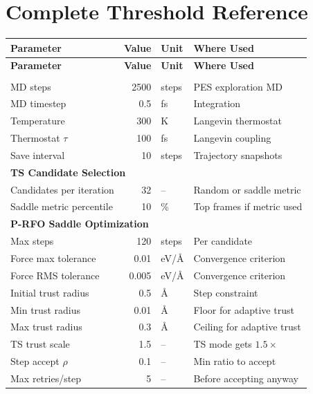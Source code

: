 \documentclass[11pt,a4paper]{article}
\begin{document}
\section{Complete Threshold Reference}
\label{sec:thresholds}

\begin{longtable}{p{5cm}rlp{6cm}}
\toprule
\textbf{Parameter} & \textbf{Value} & \textbf{Unit} & \textbf{Where Used} \\
\midrule
\endfirsthead
\toprule
\textbf{Parameter} & \textbf{Value} & \textbf{Unit} & \textbf{Where Used} \\
\midrule
\endhead
\bottomrule
\endfoot
\multicolumn{4}{l}{\textbf{Molecular Dynamics}} \\
\midrule
MD steps & 2500 & steps & PES exploration MD \\
MD timestep & 0.5 & fs & Integration \\
Temperature & 300 & K & Langevin thermostat \\
Thermostat $\tau$ & 100 & fs & Langevin coupling \\
Save interval & 10 & steps & Trajectory snapshots \\
\midrule
\multicolumn{4}{l}{\textbf{TS Candidate Selection}} \\
\midrule
Candidates per iteration & 32 & -- & Random or saddle metric \\
Saddle metric percentile & 10 & \% & Top frames if metric used \\
\midrule
\multicolumn{4}{l}{\textbf{P-RFO Saddle Optimization}} \\
\midrule
Max steps & 120 & steps & Per candidate \\
Force max tolerance & 0.01 & eV/\AA & Convergence criterion \\
Force RMS tolerance & 0.005 & eV/\AA & Convergence criterion \\
Initial trust radius & 0.5 & \AA & Step constraint \\
Min trust radius & 0.01 & \AA & Floor for adaptive trust \\
Max trust radius & 0.3 & \AA & Ceiling for adaptive trust \\
TS trust scale & 1.5 & -- & TS mode gets $1.5\times$ \\
Step accept $\rho$ & 0.1 & -- & Min ratio to accept \\
Max retries/step & 5 & -- & Before accepting anyway \\

\end{longtable}
\end{document}
